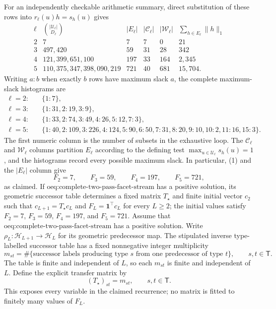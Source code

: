 For an independently checkable arithmetic summary, direct substitution of these rows into \(r_\ell(u)h=s_h(u)\) gives
\[
\begin{array}{c|r|r|r|r|r}
\ell&\binom{|\mathcal U_\ell|}{D_\ell}&|E_\ell|&|\mathcal C_\ell|&|\mathcal W_\ell|&
\sum_{h\in E_\ell}\|h\|_1\\ \hline
2&7&7&7&0&21\\
3&497{,}420&59&31&28&342\\
4&121{,}399{,}651{,}100&197&33&164&2{,}345\\
5&110{,}375{,}347{,}398{,}090{,}219&721&40&681&15{,}704.
\end{array}
\]
Writing \(a:b\) when exactly \(b\) rows have maximum slack \(a\), the complete maximum-slack histograms are
\[
\begin{aligned}
\ell=2:&\quad \{1:7\},\\
\ell=3:&\quad \{1:31,2:19,3:9\},\\
\ell=4:&\quad \{1:33,2:74,3:49,4:26,5:12,7:3\},\\
\ell=5:&\quad \{1:40,2:109,3:226,4:124,5:90,6:50,7:31,8:20,9:10,10:2,11:16,15:3\}.
\end{aligned}
\]
The first numeric column is the number of subsets in the exhaustive loop.  The \(\mathcal C_\ell\) and \(\mathcal W_\ell\) columns partition \(E_\ell\) according to the defining test \(\max_{u\in\mathcal U_\ell}s_h(u)=1\), and the histograms record every possible maximum slack.  In particular, (1) and the \(|E_\ell|\) column give
\[
F_2=7,\qquad F_3=59,\qquad F_4=197,\qquad F_5=721,
\]
as claimed.
If \(\text{oeq:complete-two-pass-facet-stream}\) has a positive solution, its geometric successor table determines a fixed matrix \(T_\star\) and finite initial vector \(c_2\) such that \(c_{L+1}=T_\star c_L\) and \(F_L=\mathbf 1^\top c_L\) for every \(L\ge2\); the initial values satisfy \(F_2=7\), \(F_3=59\), \(F_4=197\), and \(F_5=721\).
Assume that \(\text{oeq:complete-two-pass-facet-stream}\) has a positive solution.  Write \(\rho_L:\mathcal H_{L+1}\to\mathcal H_L\) for its geometric predecessor map.  The stipulated inverse type-labelled successor table has a fixed nonnegative integer multiplicity
\[
m_{st}=\#\{\text{successor labels producing type }s
                 \text{ from one predecessor of type }t\},
\qquad s,t\in\mathsf T.
\]
The table is finite and independent of \(L\), so each \(m_{st}\) is finite and independent of \(L\).  Define the explicit transfer matrix by
\[
(T_\star)_{st}=m_{st},\qquad s,t\in\mathsf T. \tag{2}
\]
This exposes every variable in the claimed recurrence; no matrix is fitted to finitely many values of \(F_L\).

